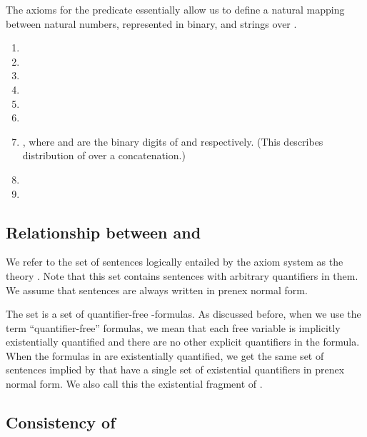 The axioms for the  predicate essentially allow us to define a
natural mapping between natural numbers, represented in binary, and
strings over .

\begin{enumerate}[resume]

\item 

\item 

\item 

\item 
  
\item 

\item 



\item , where  and  are the binary
  digits of  and  respectively. (This describes distribution of  over a concatenation.)



\item 

\item 


\end{enumerate}

\subsection{Relationship between  and }

We refer to the set of sentences logically entailed by the axiom
system  as the theory . Note that this set
contains sentences with arbitrary quantifiers in them. We assume that
sentences are always written in prenex normal form.

The set  is a set of quantifier-free -formulas. As discussed
before, when we use the term ``quantifier-free'' formulas, we mean
that each free variable is implicitly existentially quantified and
there are no other explicit quantifiers in the formula. When the
formulas in  are existentially quantified, we get the same set
of sentences implied by  that have a single set of existential
quantifiers in prenex normal form. We also call this the existential
fragment of .

\subsection{Consistency of }

